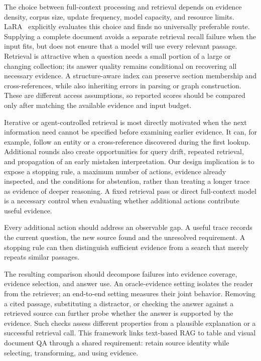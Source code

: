 The choice between full-context processing and retrieval depends on evidence density, corpus size, update frequency, model capacity, and resource limits. LaRA~\cite{lara2025} explicitly evaluates this choice and finds no universally preferable route. Supplying a complete document avoids a separate retrieval recall failure when the input fits, but does not ensure that a model will use every relevant passage. Retrieval is attractive when a question needs a small portion of a large or changing collection; its answer quality remains conditional on recovering all necessary evidence. A structure-aware index can preserve section membership and cross-references, while also inheriting errors in parsing or graph construction. These are different access assumptions, so reported scores should be compared only after matching the available evidence and input budget.

Iterative or agent-controlled retrieval is most directly motivated when the next information need cannot be specified before examining earlier evidence. It can, for example, follow an entity or a cross-reference discovered during the first lookup. Additional rounds also create opportunities for query drift, repeated retrieval, and propagation of an early mistaken interpretation. Our design implication is to expose a stopping rule, a maximum number of actions, evidence already inspected, and the conditions for abstention, rather than treating a longer trace as evidence of deeper reasoning. A fixed retrieval pass or direct full-context model is a necessary control when evaluating whether additional actions contribute useful evidence.

Every additional action should address an observable gap. A useful trace records the current question, the new source found and the unresolved requirement. A stopping rule can then distinguish sufficient evidence from a search that merely repeats similar passages.

The resulting comparison should decompose failures into evidence coverage, evidence selection, and answer use. An oracle-evidence setting isolates the reader from the retriever; an end-to-end setting measures their joint behavior. Removing a cited passage, substituting a distractor, or checking the answer against a retrieved source can further probe whether the answer is supported by the evidence. Such checks assess different properties from a plausible explanation or a successful retrieval call. This framework links text-based RAG to table and visual document QA through a shared requirement: retain source identity while selecting, transforming, and using evidence.
